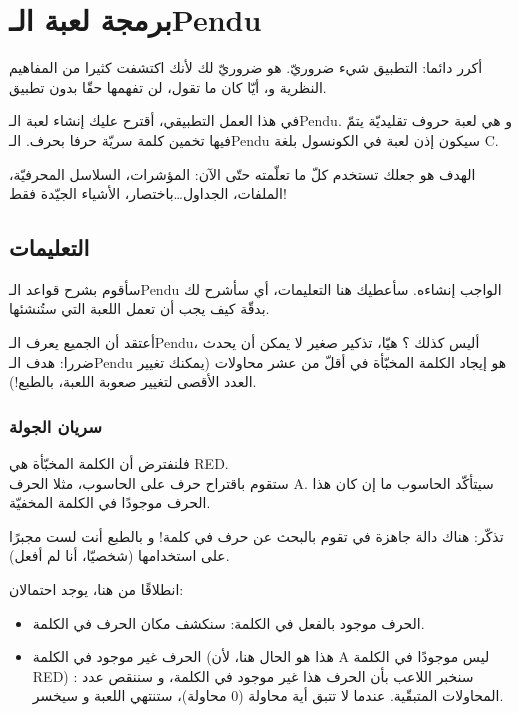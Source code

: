 \chapter{برمجة لعبة الـ\textenglish{Pendu}}

أكرر دائما: التطبيق شيء ضروريّ. هو ضروريّ لك لأنك اكتشفت كثيرا من المفاهيم النظرية و، أيّا كان ما تقول، لن تفهمها حقّا بدون تطبيق.

في هذا العمل التطبيقي، أقترح عليك إنشاء لعبة الـ\textenglish{Pendu}.
و هي لعبة حروف تقليديّة يتمّ فيها تخمين كلمة سريّة حرفا بحرف. الـ\textenglish{Pendu}
سيكون إذن لعبة في الكونسول بلغة
\textenglish{C}.

الهدف هو جعلك تستخدم كلّ ما تعلّمته حتّى الآن: المؤشرات، السلاسل المحرفيّة، الملفات، الجداول\dots باختصار، الأشياء الجيّدة فقط!

\section{التعليمات}

سأقوم بشرح قواعد الـ\textenglish{Pendu}
الواجب إنشاءه. سأعطيك هنا التعليمات، أي سأشرح لك بدقّة كيف يجب أن تعمل اللعبة التي ستُنشئها.

أعتقد أن الجميع يعرف
الـ\textenglish{Pendu}،
أليس كذلك ؟ هيّا، تذكير صغير لا يمكن أن يحدث ضررا: هدف الـ\textenglish{Pendu}
هو إيجاد الكلمة المخبّأة في أقلّ من عشر محاولات (يمكنك تغيير العدد الأقصى لتغيير صعوبة اللعبة، بالطبع!).

\subsection{سريان الجولة}
فلنفترض أن الكلمة المخبّأة هي \textenglish{RED}.\\
ستقوم باقتراح حرف على الحاسوب، مثلا الحرف
\textenglish{A}.
سيتأكّد الحاسوب ما إن كان هذا الحرف موجودًا في الكلمة المخفيّة.

\begin{information}
تذكّر: هناك دالة جاهزة في
تقوم بالبحث عن حرف في كلمة! و بالطبع أنت لست مجبرًا على استخدامها (شخصيّا، أنا لم أفعل).
\end{information}

انطلاقًا من هنا، يوجد احتمالان:

\begin{itemize}
  \item الحرف موجود بالفعل في الكلمة: سنكشف مكان الحرف في الكلمة.
  \item الحرف غير موجود في الكلمة (هذا هو الحال هنا، لأن
\textenglish{A}
ليس موجودًا في الكلمة
\textenglish{RED}) :
سنخبر اللاعب بأن الحرف هذا غير موجود في الكلمة، و سننقص عدد المحاولات المتبقّية. عندما لا تتبق أية محاولة (0 محاولة)، ستنتهي اللعبة و سيخسر.
\end{itemize}


